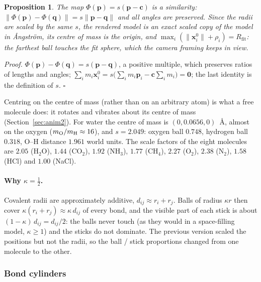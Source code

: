 \documentclass[a4paper, 11pt]{article}
\newtheorem{proposition}{{\bf Proposition}}
\begin{document}
\begin{proposition}\label{prop:similar}
The map $\Phi(\mathbf p)=s(\mathbf p-\mathbf c)$ is a similarity: $\|\Phi(\mathbf p)-\Phi(\mathbf q)\|=s\|\mathbf p-\mathbf q\|$ and all angles are preserved.
Since the radii are scaled by the same $s$, the rendered model is an exact scaled copy of the model in {\AA}ngstr\"om, its centre of mass is the
origin, and $\max_i(\|\mathbf x_i^0\|+\rho_i)=R_{\text{fit}}$: the farthest ball touches the fit sphere, which the camera framing keeps in view.
\end{proposition}
\noindent\textit{Proof.} $\Phi(\mathbf p)-\Phi(\mathbf q)=s(\mathbf p-\mathbf q)$, a positive multiple, which preserves ratios of lengths and angles;
$\sum_i m_i\mathbf x_i^0=s\bigl(\sum_i m_i\mathbf p_i-\mathbf c\sum_i m_i\bigr)=\mathbf 0$; the last identity is the definition of $s$. \hfill$\square$

Centring on the centre of mass (rather than on an arbitrary atom) is what a free molecule does: it rotates and vibrates about its centre of mass
(Section~\ref{sec:anim2}). For water the centre of mass is $(0,0.0656,0)$~{\AA}, almost on the oxygen ($m_{\text O}/m_{\text H}\approx16$), and
$s=2.049$: oxygen ball $0.748$, hydrogen ball $0.318$, O--H distance $1.961$ world units. The scale factors of the eight molecules are
$2.05$ (H$_2$O), $1.44$ (CO$_2$), $1.92$ (NH$_3$), $1.77$ (CH$_4$), $2.27$ (O$_2$), $2.38$ (N$_2$), $1.58$ (HCl) and $1.00$ (NaCl).

\paragraph{Why $\kappa=\tfrac12$.} Covalent radii are approximately additive, $d_{ij}\approx r_i+r_j$. Balls of radius $\kappa r$ then cover
$\kappa(r_i+r_j)\approx\kappa\,d_{ij}$ of every bond, and the visible part of each stick is about $(1-\kappa)\,d_{ij}=d_{ij}/2$: the balls never
touch (as they would in a space-filling model, $\kappa\ge1$) and the sticks do not dominate. The previous version scaled the positions but not
the radii, so the ball / stick proportions changed from one molecule to the other.

\subsubsection{Bond cylinders}\label{sec:bondcyl}
\end{document}

